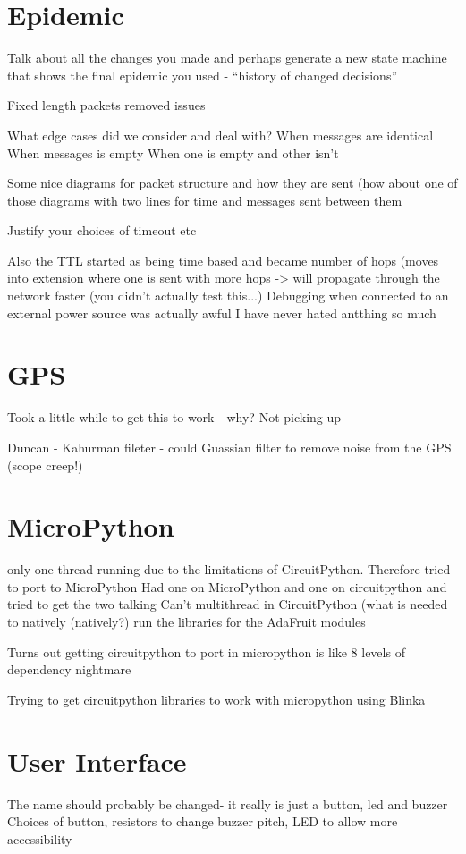 \documentclass[12pt,a4paper]{report}
\begin{document}
\section{Epidemic}
Talk about all the changes you made and perhaps generate a new state machine that shows the final epidemic you used - ``history of changed decisions''

Fixed length packets removed issues 


What edge cases did we consider and deal with? When messages are identical 
When messages is empty 
When one is empty and other isn't


Some nice diagrams for packet structure and how they are sent (how about one of those diagrams with two lines for time and messages sent between them

Justify your choices of timeout etc

Also the TTL started as being time based and became number of hops (moves into extension where one is sent with more hops -> will propagate through the network faster (you didn't actually test this...)
Debugging when connected to an external power source was actually awful I have never hated antthing so much 

\section{GPS} 
Took a little while to get this to work - why? Not picking up

Duncan - Kahurman fileter - could Guassian filter to remove noise from the GPS (scope creep!)
 

\section{MicroPython}
only one thread running due to the limitations of CircuitPython. 
Therefore tried to port to MicroPython
Had one on MicroPython and one on circuitpython and tried to get the two talking
Can't multithread in CircuitPython (what is needed to natively (natively?) run the libraries for the AdaFruit modules

Turns out getting circuitpython to port in micropython is like 8 levels of dependency nightmare

Trying to get circuitpython libraries to work with micropython using Blinka


\section{User Interface}
The name should probably be changed- it really is just a button, led and buzzer
Choices of button, resistors to change buzzer pitch, LED to allow more accessibility
\end{document}
